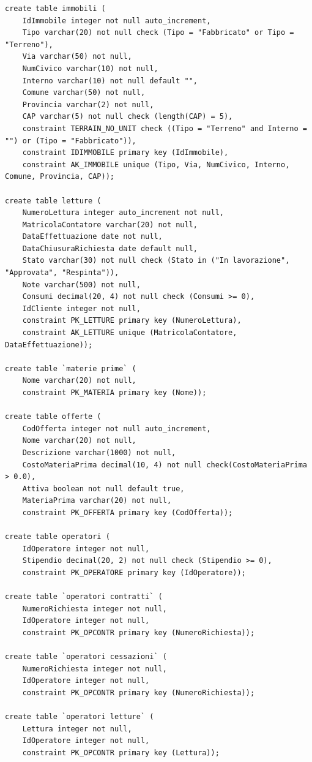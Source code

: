 \documentclass[a4paper,12pt]{report}
\begin{document}
\begin{lstlisting}
create table immobili (
    IdImmobile integer not null auto_increment,
    Tipo varchar(20) not null check (Tipo = "Fabbricato" or Tipo = "Terreno"),
    Via varchar(50) not null,
    NumCivico varchar(10) not null,
    Interno varchar(10) not null default "",
    Comune varchar(50) not null,
    Provincia varchar(2) not null,
    CAP varchar(5) not null check (length(CAP) = 5),
    constraint TERRAIN_NO_UNIT check ((Tipo = "Terreno" and Interno = "") or (Tipo = "Fabbricato")),
    constraint IDIMMOBILE primary key (IdImmobile),
    constraint AK_IMMOBILE unique (Tipo, Via, NumCivico, Interno, Comune, Provincia, CAP));

create table letture (
    NumeroLettura integer auto_increment not null,
    MatricolaContatore varchar(20) not null,
    DataEffettuazione date not null,
    DataChiusuraRichiesta date default null,
    Stato varchar(30) not null check (Stato in ("In lavorazione", "Approvata", "Respinta")),
    Note varchar(500) not null,
    Consumi decimal(20, 4) not null check (Consumi >= 0),
    IdCliente integer not null,
    constraint PK_LETTURE primary key (NumeroLettura),
    constraint AK_LETTURE unique (MatricolaContatore, DataEffettuazione));

create table `materie prime` (
    Nome varchar(20) not null,
    constraint PK_MATERIA primary key (Nome));

create table offerte (
    CodOfferta integer not null auto_increment,
    Nome varchar(20) not null,
    Descrizione varchar(1000) not null,
    CostoMateriaPrima decimal(10, 4) not null check(CostoMateriaPrima > 0.0),
    Attiva boolean not null default true,
    MateriaPrima varchar(20) not null,
    constraint PK_OFFERTA primary key (CodOfferta));

create table operatori (
    IdOperatore integer not null,
    Stipendio decimal(20, 2) not null check (Stipendio >= 0),
    constraint PK_OPERATORE primary key (IdOperatore));
    
create table `operatori contratti` (
    NumeroRichiesta integer not null,
    IdOperatore integer not null,
    constraint PK_OPCONTR primary key (NumeroRichiesta));
    
create table `operatori cessazioni` (
    NumeroRichiesta integer not null,
    IdOperatore integer not null,
    constraint PK_OPCONTR primary key (NumeroRichiesta));
    
create table `operatori letture` (
    Lettura integer not null,
    IdOperatore integer not null,
    constraint PK_OPCONTR primary key (Lettura));
    

\end{lstlisting}
\end{document}
